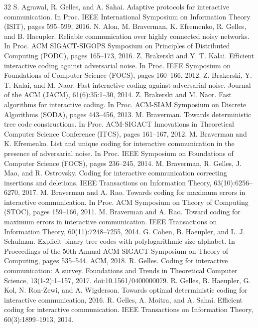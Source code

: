 \begin{thebibliography}{32}
 S. Agrawal, R. Gelles, and A. Sahai. Adaptive protocols for interactive communication. In Proc. IEEE International Symposium on Information Theory (ISIT), pages 595–599, 2016.
 N. Alon, M. Braverman, K. Efremenko, R. Gelles, and B. Haeupler. Reliable communication over highly connected noisy networks. In Proc. ACM SIGACT-SIGOPS Symposium on Principles of Distributed Computing (PODC), pages 165–173, 2016.
 Z. Brakerski and Y. T. Kalai. Efficient interactive coding against adversarial noise. In Proc. IEEE Symposium on Foundations of Computer Science (FOCS), pages 160–166, 2012.
 Z. Brakerski, Y. T. Kalai, and M. Naor. Fast interactive coding against adversarial noise. Journal of the ACM (JACM), 61(6):35:1–30, 2014.
 Z. Brakerski and M. Naor. Fast algorithms for interactive coding. In Proc. ACM-SIAM Symposium on Discrete Algorithms (SODA), pages 443–456, 2013.
 M. Braverman. Towards deterministic tree code constructions. In Proc. ACM-SIGACT Innovations in Theoretical Computer Science Conference (ITCS), pages 161–167, 2012.
 M. Braverman and K. Efremenko. List and unique coding for interactive communication in the presence of adversarial noise. In Proc. IEEE Symposium on Foundations of Computer Science (FOCS), pages 236–245, 2014.
 M. Braverman, R. Gelles, J. Mao, and R. Ostrovsky. Coding for interactive communication correcting insertions and deletions. IEEE Transactions on Information Theory, 63(10):6256– 6270, 2017.
 M. Braverman and A. Rao. Towards coding for maximum errors in interactive communication. In Proc. ACM Symposium on Theory of Computing (STOC), pages 159–166, 2011.
 M. Braverman and A. Rao. Toward coding for maximum errors in interactive communication. IEEE Transactions on Information Theory, 60(11):7248–7255, 2014.
 G. Cohen, B. Haeupler, and L. J. Schulman. Explicit binary tree codes with polylogarithmic size alphabet. In Proceedings of the 50th Annual ACM SIGACT Symposium on Theory of Computing, pages 535–544. ACM, 2018.
 R. Gelles. Coding for interactive communication: A survey. Foundations and Trends in Theoretical Computer Science, 13(1-2):1–157, 2017. doi:10.1561/0400000079.
 R. Gelles, B. Haeupler, G. Kol, N. Ron-Zewi, and A. Wigderson. Towards optimal deterministic coding for interactive communication, 2016.
 R. Gelles, A. Moitra, and A. Sahai. Efficient coding for interactive communication. IEEE Transactions on Information Theory, 60(3):1899–1913, 2014.

\end{thebibliography}
